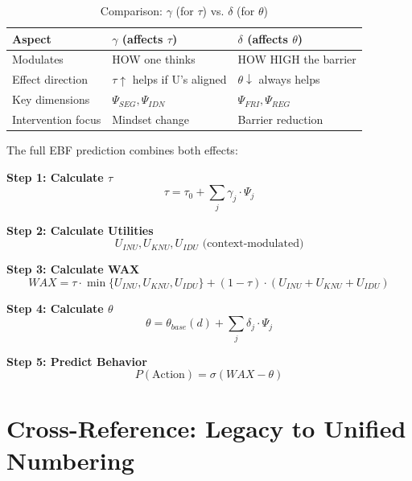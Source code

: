 \begin{table}[htbp]
\centering
\caption{Comparison: $\gamma$ (for $\tau$) vs. $\delta$ (for $\theta$)}
\label{tab:gamma-vs-delta}
\begin{tabular}{@{}lll@{}}
\toprule
\textbf{Aspect} & \textbf{$\gamma$ (affects $\tau$)} & \textbf{$\delta$ (affects $\theta$)} \\
\midrule
Modulates & HOW one thinks & HOW HIGH the barrier \\
Effect direction & $\tau \uparrow$ helps if U's aligned & $\theta \downarrow$ always helps \\
Key dimensions & $\Psi_{SEG}, \Psi_{IDN}$ & $\Psi_{FRI}, \Psi_{REG}$ \\
Intervention focus & Mindset change & Barrier reduction \\
\bottomrule
\end{tabular}
\end{table}

\begin{tcolorbox}[colback=blue!5!white,colframe=blue!75!black,title=Complete Behavioral Prediction Model]
The full EBF prediction combines both effects:

\textbf{Step 1: Calculate $\tau$}
\begin{equation}
\tau = \tau_0 + \sum_j \gamma_j \cdot \Psi_j
\end{equation}

\textbf{Step 2: Calculate Utilities}
\begin{equation}
U_{INU}, U_{KNU}, U_{IDU} \text{ (context-modulated)}
\end{equation}

\textbf{Step 3: Calculate WAX}
\begin{equation}
WAX = \tau \cdot \min\{U_{INU}, U_{KNU}, U_{IDU}\} + (1-\tau) \cdot (U_{INU} + U_{KNU} + U_{IDU})
\end{equation}

\textbf{Step 4: Calculate $\theta$}
\begin{equation}
\theta = \theta_{base}(d) + \sum_j \delta_j \cdot \Psi_j
\end{equation}

\textbf{Step 5: Predict Behavior}
\begin{equation}
P(\text{Action}) = \sigma(WAX - \theta)
\end{equation}
\end{tcolorbox}


\section{Cross-Reference: Legacy to Unified Numbering}
\label{sec:av-crossref}

